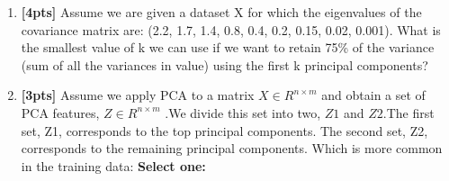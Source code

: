 \documentclass[12pt]{article}
\renewcommand{\circle}{\tikz\draw[black] (0,0) circle (1ex);}
\begin{document}
\begin{enumerate}
    \item \textbf{[4pts]} Assume we are given a dataset X for which the eigenvalues of the covariance matrix are:
    (2.2, 1.7, 1.4, 0.8, 0.4, 0.2, 0.15, 0.02, 0.001). What is the smallest value of k we can use if we want to retain 75\% of the variance (sum of all the variances in value) using the first k principal components?
    
    \begin{tcolorbox}[fit,height=1cm, width=2cm, blank, borderline={1pt}{-2pt},nobeforeafter]
    \end{tcolorbox}
    
    
    \item \textbf{[3pts]} Assume we apply PCA to a matrix $X \in R^{n \times m}$ and obtain a set of PCA features, $Z \in R^{n \times m}$ .We divide this set into two, $Z1$ and $Z2$.The first set, Z1, corresponds to the top principal components. The second set, Z2, corresponds to the remaining principal components. Which is more common in the training data:
    \textbf{Select one:}
    

\end{enumerate}
\end{document}
